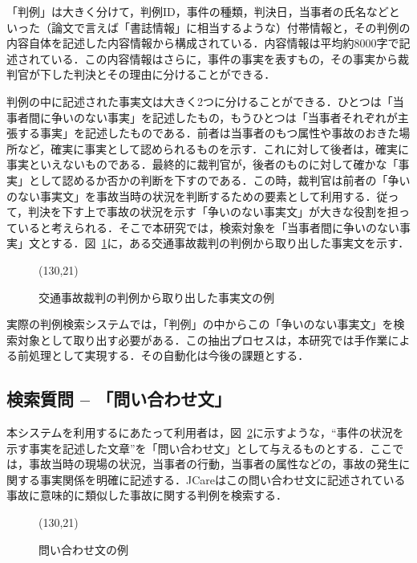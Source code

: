 「判例」は大きく分けて，判例ID，事件の種類，判決日，当事者の氏名などといった（論文で言えば「書誌情報」に相当するような）付帯情報と，その判例の内容自体を記述した内容情報から構成されている．内容情報は平均約8000字で記述されている．この内容情報はさらに，事件の事実を表すもの，その事実から裁判官が下した判決とその理由に分けることができる．

判例の中に記述された事実文は大きく2つに分けることができる．ひとつは「当事者間に争いのない事実」を記述したもの，もうひとつは「当事者それぞれが主張する事実」を記述したものである．前者は当事者のもつ属性や事故のおきた場所など，確実に事実として認められるものを示す．これに対して後者は，確実に事実といえないものである．最終的に裁判官が，後者のものに対して確かな「事実」として認めるか否かの判断を下すのである．この時，裁判官は前者の「争いのない事実文」を事故当時の状況を判断するための要素として利用する．従って，判決を下す上で事故の状況を示す「争いのない事実文」が大きな役割を担っていると考えられる．そこで本研究では，検索対象を「当事者間に争いのない事実」文とする．図~\ref{fig:judicialcase}に，ある交通事故裁判の判例から取り出した事実文を示す．

\begin{figure}
\begin{center}
 \atari(130,21)
 \caption{交通事故裁判の判例から取り出した事実文の例}
 \label{fig:judicialcase}
\end{center}
\end{figure}

実際の判例検索システムでは，「判例」の中からこの「争いのない事実文」を検索対象として取り出す必要がある．この抽出プロセスは，本研究では手作業による前処理として実現する．その自動化は今後の課題とする．

\subsection{検索質問 -- 「問い合わせ文」}
本システムを利用するにあたって利用者は，図~\ref{fig:query}に示すような，``事件の状況を示す事実を記述した文章''を「問い合わせ文」として与えるものとする．ここでは，事故当時の現場の状況，当事者の行動，当事者の属性などの，事故の発生に関する事実関係を明確に記述する．JCareはこの問い合わせ文に記述されている事故に意味的に類似した事故に関する判例を検索する．

\begin{figure}
\begin{center}
 \atari(130,21)
 \caption{問い合わせ文の例}
 \label{fig:query}
\end{center}
\end{figure}

